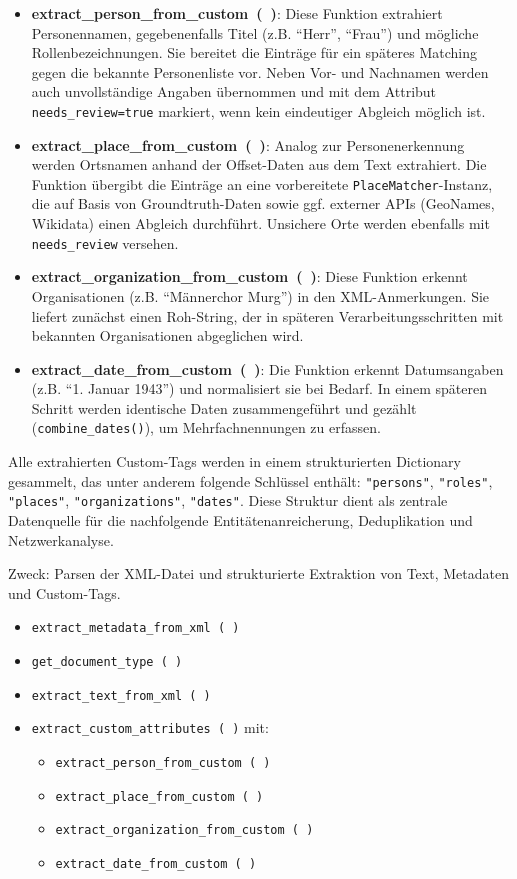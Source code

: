 \documentclass[12pt, a4paper, ngerman, bidi=default]{article}
\newcommand{\code}[1]{\colorbox{VeryLightGray}{\texttt{#1}}} %
\begin{document}
\begin{itemize}
  \item \textbf{extract\_person\_from\_custom~(~)}: Diese Funktion extrahiert Personennamen, gegebenenfalls Titel (z.B. \enquote{Herr}, \enquote{Frau}) und mögliche Rollenbezeichnungen. Sie bereitet die Einträge für ein späteres Matching gegen die bekannte Personenliste vor. Neben Vor- und Nachnamen werden auch unvollständige Angaben übernommen und mit dem Attribut \code{needs\_review=true} markiert, wenn kein eindeutiger Abgleich möglich ist.
  
  \item \textbf{extract\_place\_from\_custom~(~)}: Analog zur Personenerkennung werden Ortsnamen anhand der Offset-Daten aus dem Text extrahiert. Die Funktion übergibt die Einträge an eine vorbereitete \code{PlaceMatcher}-Instanz, die auf Basis von Groundtruth-Daten sowie ggf. externer APIs (GeoNames, Wikidata) einen Abgleich durchführt. Unsichere Orte werden ebenfalls mit \code{needs\_review} versehen.
  
  \item \textbf{extract\_organization\_from\_custom~(~)}: Diese Funktion erkennt Organisationen (z.B. \enquote{Männerchor Murg}) in den XML-Anmerkungen. Sie liefert zunächst einen Roh-String, der in späteren Verarbeitungsschritten mit bekannten Organisationen abgeglichen wird. 
  
  \item \textbf{extract\_date\_from\_custom~(~)}: Die Funktion erkennt Datumsangaben (z.B. \enquote{1. Januar 1943}) und normalisiert sie bei Bedarf. In einem späteren Schritt werden identische Daten zusammengeführt und gezählt (\code{combine\_dates()}), um Mehrfachnennungen zu erfassen.
\end{itemize}

Alle extrahierten Custom-Tags werden in einem strukturierten Dictionary gesammelt, das unter anderem folgende Schlüssel enthält: \code{"persons"}, \code{"roles"}, \code{"places"}, \code{"organizations"}, \code{"dates"}. Diese Struktur dient als zentrale Datenquelle für die nachfolgende Entitätenanreicherung, Deduplikation und Netzwerkanalyse.



Zweck: Parsen der XML-Datei und strukturierte Extraktion von Text, Metadaten und Custom-Tags.
\begin{itemize}
\item \texttt{extract\_metadata\_from\_xml~(~)}
\item \texttt{get\_document\_type~(~)}
\item \texttt{extract\_text\_from\_xml~(~)}
\item \texttt{extract\_custom\_attributes~(~)} mit:
  \begin{itemize}
  \item \texttt{extract\_person\_from\_custom~(~)}
  \item \texttt{extract\_place\_from\_custom~(~)}
  \item \texttt{extract\_organization\_from\_custom~(~)}
  \item \texttt{extract\_date\_from\_custom~(~)}
  \end{itemize}
\end{itemize}
\end{document}
